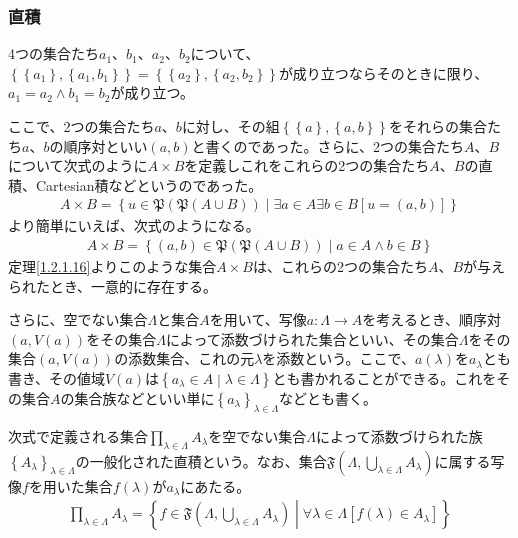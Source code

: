 \documentclass[a4paper]{jsarticle}
\begin{document}
\subsubsection{直積}%
\begin{thm*}
4つの集合たち$a_{1}$、$b_{1}$、$a_{2}$、$b_{2}$について、$\left\{ \left\{ a_{1} \right\},\left\{ a_{1},b_{1} \right\} \right\} = \left\{ \left\{ a_{2} \right\},\left\{ a_{2},b_{2} \right\} \right\}$が成り立つならそのときに限り、$a_{1} = a_{2} \land b_{1} = b_{2}$が成り立つ。
\end{thm*}
ここで、2つの集合たち$a$、$b$に対し、その組$\left\{ \left\{ a \right\},\left\{ a,b \right\} \right\}$をそれらの集合たち$a$、$b$の順序対といい$(a,b)$と書くのであった。さらに、2つの集合たち$A$、$B$について次式のように$A \times B$を定義しこれをこれらの2つの集合たち$A$、$B$の直積、Cartesian積などというのであった。
\begin{align*}
A \times B = \left\{ u \in \mathfrak{P}\left( \mathfrak{P}(A \cup B) \right) \middle| \exists a \in A\exists b \in B\left[ u = (a,b) \right] \right\}
\end{align*}
より簡単にいえば、次式のようになる。
\begin{align*}
A \times B = \left\{ (a,b)\in \mathfrak{P}\left( \mathfrak{P}(A \cup B) \right) \middle| a \in A \land b \in B \right\}
\end{align*}
定理\ref{1.2.1.16}よりこのような集合$A \times B$は、これらの2つの集合たち$A$、$B$が与えられたとき、一意的に存在する。\par
さらに、空でない集合$\varLambda$と集合$A$を用いて、写像$a:\varLambda \rightarrow A$を考えるとき、順序対$\left( a,V(a) \right)$をその集合$\varLambda$によって添数づけられた集合といい、その集合$\varLambda$をその集合$\left( a,V(a) \right)$の添数集合、これの元$\lambda$を添数という。ここで、$a(\lambda)$を$a_{\lambda}$とも書き、その値域$V(a)$は$\left\{ a_{\lambda} \in A \middle| \lambda \in \varLambda \right\}$とも書かれることができる。これをその集合$A$の集合族などといい単に$\left\{ a_{\lambda} \right\}_{\lambda \in \varLambda}$などとも書く。\par
次式で定義される集合$\prod_{\lambda \in \varLambda} A_{\lambda}$を空でない集合$\varLambda$によって添数づけられた族$\left\{ A_{\lambda} \right\}_{\lambda \in \varLambda}$の一般化された直積という。なお、集合$\mathfrak{F}\left( \varLambda,\bigcup_{\lambda \in \varLambda} A_{\lambda} \right)$に属する写像$f$を用いた集合$f(\lambda)$が$a_{\lambda}$にあたる。
\begin{align*}
\prod_{\lambda \in \varLambda} A_{\lambda} = \left\{ f \in \mathfrak{F}\left( \varLambda,\bigcup_{\lambda \in \varLambda} A_{\lambda} \right) \middle| \forall\lambda \in \varLambda\left[ f(\lambda) \in A_{\lambda} \right] \right\}
\end{align*}
\end{document}
